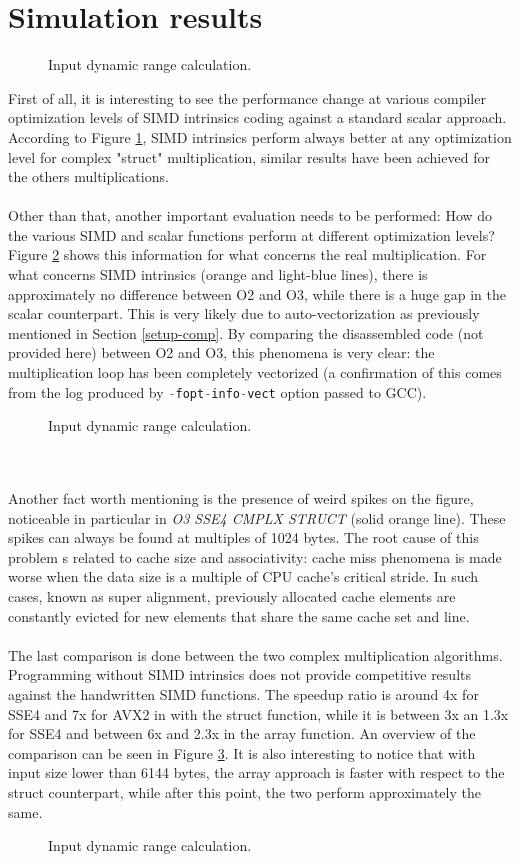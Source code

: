 \documentclass[a4paper]{article}
\begin{document}
\section{Simulation results} \label{results}
\begin{figure}[ht!]
	\centering
	\resizebox{1.0\textwidth}{!}{}
	\caption{Input dynamic range calculation.}
	\label{Fig:OPTIM}
\end{figure}
First of all, it is interesting to see the performance change at various compiler optimization levels of SIMD intrinsics coding against a standard scalar approach. According to Figure \ref{Fig:OPTIM}, SIMD intrinsics perform always better at any optimization level for complex "struct" multiplication, similar results have been achieved for the others multiplications.
\\\\Other than that, another important evaluation needs to be performed: How do the various SIMD and scalar functions perform at different optimization levels?
Figure \ref{Fig:SCALAR} shows this information for what concerns the real multiplication.
For what concerns SIMD intrinsics (orange and light-blue lines), there is approximately no difference between O2 and O3, while there is a huge gap in the scalar counterpart. This is very likely due to auto-vectorization as previously mentioned in Section \ref{setup-comp}. By comparing the disassembled code (not provided here) between O2 and O3, this phenomena is very clear: the multiplication loop has been completely vectorized (a confirmation of this comes from the log produced by \lstinline[language=c, basicstyle=\ttfamily]{-fopt-info-vect} option passed to GCC).
\begin{figure}
	\centering
	\resizebox{1.0\textwidth}{!}{}
	\caption{Input dynamic range calculation.}
	\label{Fig:SCALAR}
\end{figure}
\\\\Another fact worth mentioning is the presence of weird spikes on the figure, noticeable in particular in \textit{O3 SSE4 CMPLX STRUCT} (solid orange line). These spikes can always be found at multiples of 1024 bytes. The root cause of this problem s related to cache size and associativity: cache miss phenomena is made worse when the data size is a multiple of CPU cache's critical stride. In such cases, known as super alignment, previously allocated cache elements are constantly evicted for new elements that share the same cache set and line.
\\\\The last comparison is done between the two complex multiplication algorithms. Programming without SIMD intrinsics does not provide competitive results against the handwritten SIMD functions. The speedup ratio is around 4x for SSE4 and 7x for AVX2 in with the struct function, while it is between 3x an 1.3x for SSE4 and between 6x and 2.3x in the array function. An overview of the comparison can be seen in Figure \ref{Fig:CMPLEX}.
It is also interesting to notice that with input size lower than 6144 bytes, the array approach is faster with respect to the struct counterpart, while after this point, the two perform approximately the same.

\begin{figure}
	\centering
	\resizebox{1.0\textwidth}{!}{}
	\caption{Input dynamic range calculation.}
	\label{Fig:CMPLEX}
\end{figure}

\clearpage
\printbibliography
\end{document}
